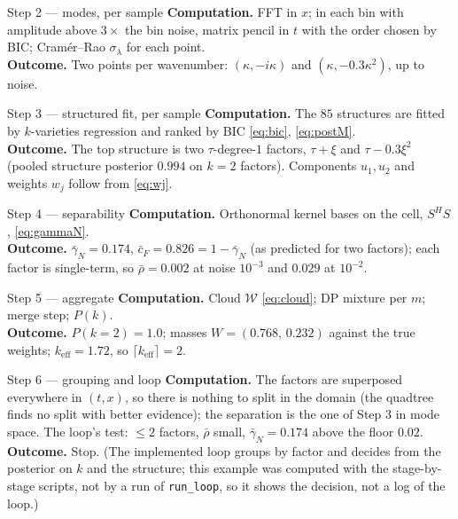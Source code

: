 \documentclass[11pt,a4paper]{article}
\theoremstyle{definition}
\begin{document}
\begin{wstep}{Step 2 --- modes, per sample}
\textbf{Computation.} FFT in $x$; in each bin with amplitude above $3\times$ the bin noise, matrix pencil in $t$ with the order chosen by BIC; Cram\'er--Rao $\sigma_\lambda$ for each point.\\
\textbf{Outcome.} Two points per wavenumber: $(\kappa,-i\kappa)$ and $(\kappa,-0.3\kappa^2)$, up to noise.
\end{wstep}

\begin{wstep}{Step 3 --- structured fit, per sample}
\textbf{Computation.} The $85$ structures are fitted by $k$-varieties regression and ranked by BIC \eqref{eq:bic}, \eqref{eq:postM}.\\
\textbf{Outcome.} The top structure is two $\tau$-degree-$1$ factors, $\tau+\xi$ and $\tau-0.3\xi^2$ (pooled structure posterior $0.994$ on $k=2$ factors). Components $u_1,u_2$ and weights $w_j$ follow from \eqref{eq:wj}.
\end{wstep}

\begin{wstep}{Step 4 --- separability}
\textbf{Computation.} Orthonormal kernel bases on the cell, $S^HS$, \eqref{eq:gammaN}.\\
\textbf{Outcome.} $\bar\gamma_N=0.174$, $\bar c_F=0.826=1-\bar\gamma_N$ (as predicted for two factors); each factor is single-term, so $\bar\rho=0.002$ at noise $10^{-3}$ and $0.029$ at $10^{-2}$.
\end{wstep}

\begin{wstep}{Step 5 --- aggregate}
\textbf{Computation.} Cloud $\mathcal W$ \eqref{eq:cloud}; DP mixture per $m$; merge step; $P(k)$.\\
\textbf{Outcome.} $P(k=2)=1.0$; masses $W=(0.768,\,0.232)$ against the true weights; $k_{\mathrm{eff}}=1.72$, so $\lceil k_{\mathrm{eff}}\rceil=2$.
\end{wstep}

\begin{wstep}{Step 6 --- grouping and loop}
\textbf{Computation.} The factors are superposed everywhere in $(t,x)$, so there is nothing to split in the domain (the quadtree finds no split with better evidence); the separation is the one of Step 3 in mode space. The loop's test: $\le2$ factors, $\bar\rho$ small, $\bar\gamma_N=0.174$ above the floor $0.02$.\\
\textbf{Outcome.} Stop. (The implemented loop groups by factor and decides from the posterior on $k$ and the structure; this example was computed with the stage-by-stage scripts, not by a run of \texttt{run\_loop}, so it shows the decision, not a log of the loop.)
\end{wstep}
\end{document}
